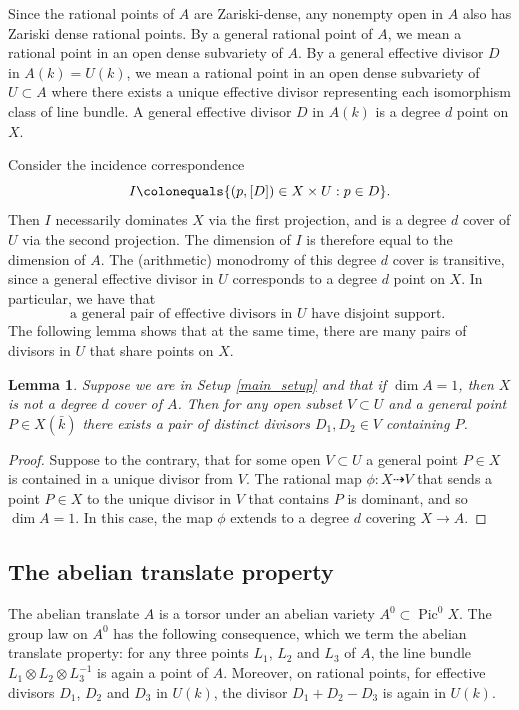 \documentclass[11pt]{amsart}
\newcommand{\defi}[1]{\textsf{#1}}
\newcommand{\kbar}{{\bar{k}}}
\DeclareMathOperator{\Pic}{Pic}
\newtheorem{lemma}[theorem]{Lemma}
\theoremstyle{definition}
\theoremstyle{remark}
\begin{document}
Since the rational points of \(A\) are Zariski-dense, any nonempty open in \(A\) also has Zariski dense rational points.  
By a \defi{general} rational point of \(A\), we mean a rational point in an open dense subvariety of \(A\).  By a \defi{general effective divisor} \(D\) in \(A(k)=U(k)\), we mean a rational point in an open dense subvariety of \(U \subset A\) where there exists a unique effective divisor representing each isomorphism class of line bundle.  
A general effective divisor \(D\) in \(A(k)\) is a degree \(d\) point on \(X\).

Consider the incidence correspondence 
\[ I \colonequals \{(p, [D]) \in X \times U : p \in D\}.\]
Then \(I\) necessarily dominates \(X\) via the first projection, and is a degree \(d\) cover of \(U\) via the second projection.  The dimension of \(I\) is therefore equal to the dimension of \(A\).  The (arithmetic) monodromy of this degree \(d\) cover is transitive, since a general effective divisor in \(U\) corresponds to a degree \(d\) point on \(X\).  In particular, we have that
\begin{equation}\label{eq:disjoint_support}
\text{a general pair of effective divisors in \(U\) have disjoint support. }
\end{equation} 
The following lemma shows that at the same time, there are many pairs of divisors in \(U\) that share points on \(X\).


\begin{lemma}\label{two-divisors-through-a-point}
Suppose we are in Setup \ref{main_setup} and that if \(\dim A = 1\), then \(X\) is not a degree \(d\) cover of \(A\). Then for any open subset $V \subset U$ and a general point $P \in X(\kbar)$ there exists a pair of distinct divisors $D_1, D_2 \in V$ containing $P$.
\end{lemma}
\begin{proof}

Suppose to the contrary, that for some open $V \subset U$ a general point $P \in X$ is contained in a unique divisor from $V$. The rational map $\phi: X \dashrightarrow V$ that sends a point $P \in X$ to the unique divisor in $V$ that contains $P$ is dominant, and so $\dim A = 1$. In this case, the map $\phi$ extends to a degree $d$ covering $X \to A$.
\end{proof}



\subsection{The abelian translate property}\label{sec:abelian-translate}
The abelian translate \(A\) is a torsor under an abelian variety \(A^0 \subset \Pic^0X\).  The group law on \(A^0\) has the following consequence, which we term the \defi{abelian translate property}: for any three points \(L_1\), \(L_2\) and \(L_3\) of \(A\), the line bundle \(L_1 \otimes L_2 \otimes L_3^{-1}\) is again a point of \(A\).  Moreover, on rational points, for effective divisors \(D_1\), \(D_2\) and \(D_3\) in \(U(k)\), 
the divisor \(D_1 + D_2 - D_3\) is again in \(U(k)\).
\end{document}
